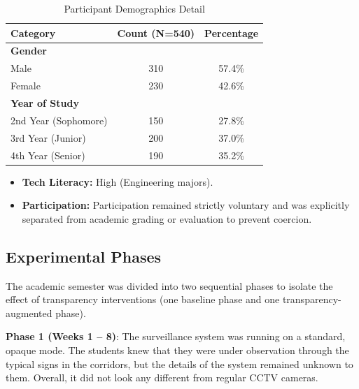\documentclass[conference]{IEEEtran}
\begin{document}
\begin{table}[htbp]
\caption{Participant Demographics Detail}
\begin{center}
\begin{tabular}{lcc}
\toprule
\textbf{Category} & \textbf{Count (N=540)} & \textbf{Percentage} \\
\midrule
\textbf{Gender} & & \\
Male & 310 & 57.4\% \\
Female & 230 & 42.6\% \\
\midrule
\textbf{Year of Study} & & \\
2nd Year (Sophomore) & 150 & 27.8\% \\
3rd Year (Junior) & 200 & 37.0\% \\
4th Year (Senior) & 190 & 35.2\% \\
\bottomrule
\end{tabular}
\end{center}
\label{tab:demographics}
\end{table}

\begin{itemize}
    \item \textbf{Tech Literacy:} High (Engineering majors).
    \item \textbf{Participation:} Participation remained strictly voluntary and was explicitly separated from academic grading or evaluation to prevent coercion.
\end{itemize}

\subsection{Experimental Phases}
The academic semester was divided into two sequential phases to isolate the effect of transparency interventions (one baseline phase and one transparency-augmented phase).

\textbf{Phase 1 (Weeks 1 – 8)}: The surveillance system was running on a standard, opaque mode. The students knew that they were under observation through the typical signs in the corridors, but the details of the system remained unknown to them. Overall, it did not look any different from regular CCTV cameras.
\end{document}

